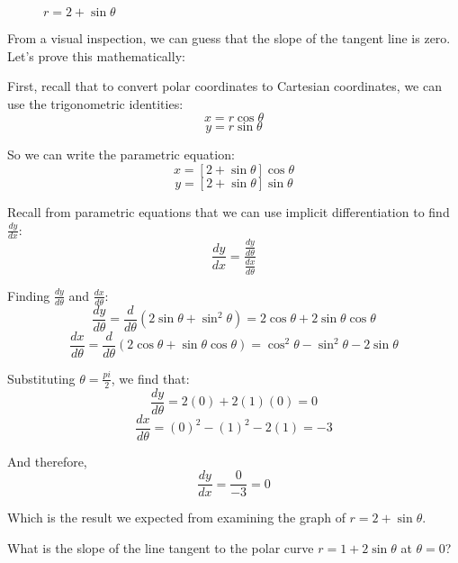 \begin{figure}[htbp]
\centering
    \label{cardioid}
    \caption{$r = 2 + \sin{\theta}$}
    \end{figure}

From a visual inspection, we can guess that the slope of the tangent line is 
zero. Let's prove this mathematically:

First, recall that to convert polar coordinates to Cartesian coordinates, we 
can use the trigonometric identities:
$$x = r\cos{\theta}$$
$$y = r\sin{\theta}$$

So we can write the parametric equation:
$$x = \left[2 + \sin{\theta} \right]\cos{\theta}$$
$$y = \left[ 2 + \sin{\theta} \right]\sin{\theta}$$

Recall from parametric equations that we can use implicit differentiation to 
find $\frac{dy}{dx}$:
$$\frac{dy}{dx} = \frac{\frac{dy}{d\theta}}{\frac{dx}{d\theta}}$$

Finding $\frac{dy}{d\theta}$ and $\frac{dx}{d\theta}$:
$$\frac{dy}{d\theta} = \frac{d}{d\theta} \left( 2\sin{\theta} + \sin^2{\theta} 
\right) = 2\cos{\theta} + 2\sin{\theta}\cos{\theta}$$
$$\frac{dx}{d\theta} = \frac{d}{d\theta} \left( 2\cos{\theta} + \sin{\theta}
\cos{\theta} \right) = \cos^2{\theta} - \sin^2{\theta} - 2\sin{\theta}$$

Substituting $\theta = \frac{pi}{2}$, we find that:
$$\frac{dy}{d\theta} = 2(0) + 2(1)(0) = 0$$
$$\frac{dx}{d\theta} = (0)^2 - (1)^2 - 2(1) = -3$$

And therefore,
$$\frac{dy}{dx} = \frac{0}{-3} = 0$$

Which is the result we expected from examining the graph of $r = 2 + \sin{
\theta}$. 


\begin{Exercise} What is the slope of the line 
tangent to the polar curve $r = 1 + 2\sin{\theta}$ at $\theta = 0$?
\end{Exercise}

